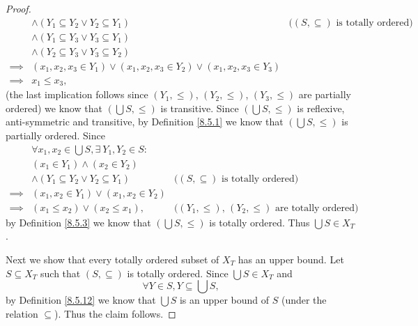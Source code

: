 \begin{proof}
\begin{align*}
                 & \land (Y_1 \subseteq Y_2 \lor Y_2 \subseteq Y_1)                                  & \text{(\((S, \subseteq)\) is totally ordered)} \\
                 & \land (Y_1 \subseteq Y_3 \lor Y_3 \subseteq Y_1)                                                                                   \\
                 & \land (Y_2 \subseteq Y_3 \lor Y_3 \subseteq Y_2)                                                                                   \\
        \implies & (x_1, x_2, x_3 \in Y_1) \lor (x_1, x_2, x_3 \in Y_2) \lor (x_1, x_2, x_3 \in Y_3)                                                  \\
        \implies & x_1 \leq x_3,
    \end{align*}
    (the last implication follows since \((Y_1, \leq)\), \((Y_2, \leq)\), \((Y_3, \leq)\) are partially ordered)
    we know that \((\bigcup S, \leq)\) is transitive.
    Since \((\bigcup S, \leq)\) is reflexive, anti-symmetric and transitive, by Definition \ref{8.5.1} we know that \((\bigcup S, \leq)\) is partially ordered.
    Since
    \begin{align*}
                 & \forall x_1, x_2 \in \bigcup S, \exists\ Y_1, Y_2 \in S :                                                                 \\
                 & (x_1 \in Y_1) \land (x_2 \in Y_2)                                                                                         \\
                 & \land (Y_1 \subseteq Y_2 \lor Y_2 \subseteq Y_1)          & \text{(\((S, \subseteq)\) is totally ordered)}                \\
        \implies & (x_1, x_2 \in Y_1) \lor (x_1, x_2 \in Y_2)                                                                                \\
        \implies & (x_1 \leq x_2) \lor (x_2 \leq x_1),                       & \text{(\((Y_1, \leq)\), \((Y_2, \leq)\) are totally ordered)}
    \end{align*}
    by Definition \ref{8.5.3} we know that \((\bigcup S, \leq)\) is totally ordered.
    Thus \(\bigcup S \in X_T\).

    Next we show that every totally ordered subset of \(X_T\) has an upper bound.
    Let \(S \subseteq X_T\) such that \((S, \subseteq)\) is totally ordered.
    Since \(\bigcup S \in X_T\) and
    \[
        \forall Y \in S, Y \subseteq \bigcup S,
    \]
    by Definition \ref{8.5.12} we know that \(\bigcup S\) is an upper bound of \(S\) (under the relation \(\subseteq\)).
    Thus the claim follows.


\end{proof}
